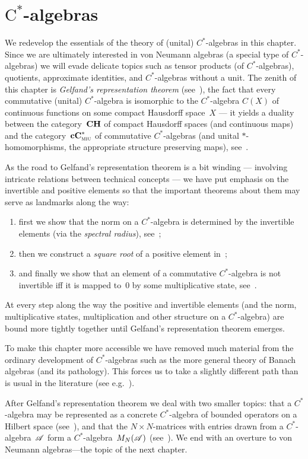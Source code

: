 \documentclass[a]{subfiles}
\begin{document}
\chapter{$\text{C}^*$-algebras}
\begin{parsec}%
\begin{point}%
We redevelop the essentials of the theory of (unital) $C^*$-algebras
in this chapter.
Since we are ultimately interested
in von Neumann algebras
(a special type of $C^*$-algebras)
we will evade
delicate
topics such as tensor products (of $C^*$-algebras), 
quotients, approximate identities,
and $C^*$-algebras without a unit.
The zenith of this chapter
is \emph{Gelfand's representation theorem} (see~),
the fact that every commutative (unital) $C^*$-algebra
is isomorphic
to the $C^*$-algebra
$C(X)$ of continuous functions on some compact Hausdorff space~$X$
--- it yields a duality
between the category~$\mathbf{CH}$ of compact Hausdorff spaces (and continuous maps)
and the category~$\mathbf{cC}^*_{\text{\textsc{miu}}}$ of commutative $C^*$-algebras (and
unital $*$-homomorphisms,
the appropriate structure preserving maps), see~.

As the road to Gelfand's representation theorem 
is a bit winding ---
involving intricate relations between technical concepts --- 
we have put emphasis on the invertible and  positive elements
so that the important
theorems about them may serve as landmarks along the way:
\begin{enumerate}
\item
first we show that the norm
on a $C^*$-algebra
is determined by the invertible elements
(via the \emph{spectral radius}), see~;

\item
then we construct a \emph{square root} of a positive element in~;

\item
and finally we
show that an element of a commutative $C^*$-algebra
is not invertible iff it is mapped to~$0$
by some multiplicative state, see~.
\end{enumerate}
At every step along the way
the positive and invertible elements 
(and the norm, multiplicative states, multiplication
and other structure on a $C^*$-algebra)
are bound more tightly together
until Gelfand's representation theorem emerges.

To make this chapter
more accessible
we have removed
much material
from the ordinary development
of $C^*$-algebras
such as the more general theory of Banach algebras
(and its pathology).
This forces us
to take a slightly different path than is usual in the literature 
(see e.g.~).

After Gelfand's representation theorem
we deal with two smaller topics:
that a $C^*$-algebra
may be represented as a concrete $C^*$-algebra
of bounded operators on a Hilbert space (see~),
and that the $N\times N$-matrices with entries drawn from a 
$C^*$-algebra~$\mathscr{A}$
form a $C^*$-algebra~$M_N(\mathscr{A})$
(see~).
We end
with an overture to von Neumann algebras---the
topic of the next chapter.
\end{point}%
\end{parsec}
\end{document}
